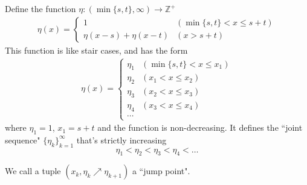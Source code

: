 \documentclass[]{article}
\begin{document}
\vspace{1cm}
\begin{definition}
	Define the function $\eta : (\min\{s, t\}, \infty) \to \mathbb{Z}^+$
	\begin{align*}
		\eta(x) = \begin{cases} 1  &(\min\{s, t\}<x\le s+t)\\
			\eta(x-s) + \eta(x-t)  &(x> s+t)
		\end{cases}
	\end{align*}
	This function is like stair cases, and has the form
	\begin{align*}
		\eta(x) = \begin{cases} \eta_1  &(\min\{s, t\}<x\le x_1)\\
			\eta_2  &(x_1<x\le x_2)\\
			\eta_3  &(x_2<x\le x_3)\\
			\eta_4  &(x_3<x\le x_4)\\
			\cdots
		\end{cases}
	\end{align*}
	where $\eta_1 = 1$,  $x_1 = s+t$ and the function is non-decreasing. It defines the ``joint sequence" $\{\eta_k\}_{k=1}^{\infty}$ that's strictly increasing
	\[
	\eta_1 < \eta_2 < \eta_3 < \eta_4 < \dots
	\]
	
	We call a tuple $(x_k, \eta_k\nearrow\eta_{k+1})$ a ``jump point".
\end{definition}
\end{document}
